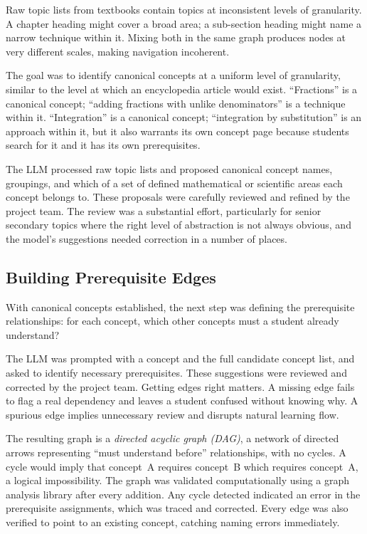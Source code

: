 \documentclass[12pt,a4paper]{article}
\begin{document}
Raw topic lists from textbooks contain topics at inconsistent levels of granularity.
A chapter heading might cover a broad area; a sub-section heading might name a
narrow technique within it.
Mixing both in the same graph produces nodes at very different scales,
making navigation incoherent.

The goal was to identify canonical concepts at a uniform level of granularity,
similar to the level at which an encyclopedia article would exist.
``Fractions'' is a canonical concept; ``adding fractions with unlike denominators''
is a technique within it.
``Integration'' is a canonical concept; ``integration by substitution'' is an approach
within it, but it also warrants its own concept page because students search for it
and it has its own prerequisites.

The LLM processed raw topic lists and proposed canonical concept names, groupings,
and which of a set of defined mathematical or scientific areas each concept belongs to.
These proposals were carefully reviewed and refined by the project team.
The review was a substantial effort, particularly for senior secondary topics where
the right level of abstraction is not always obvious, and the model's suggestions
needed correction in a number of places.

\subsection{Building Prerequisite Edges}

With canonical concepts established, the next step was defining the prerequisite
relationships: for each concept, which other concepts must a student already understand?

The LLM was prompted with a concept and the full candidate concept list,
and asked to identify necessary prerequisites.
These suggestions were reviewed and corrected by the project team.
Getting edges right matters.
A missing edge fails to flag a real dependency and leaves a student confused without
knowing why.
A spurious edge implies unnecessary review and disrupts natural learning flow.

The resulting graph is a \emph{directed acyclic graph (DAG)}, a network of directed
arrows representing ``must understand before'' relationships, with no cycles.
A cycle would imply that concept~A requires concept~B which requires concept~A,
a logical impossibility.
The graph was validated computationally using a graph analysis library after every addition.
Any cycle detected indicated an error in the prerequisite assignments, which was
traced and corrected.
Every edge was also verified to point to an existing concept, catching naming errors immediately.
\end{document}
